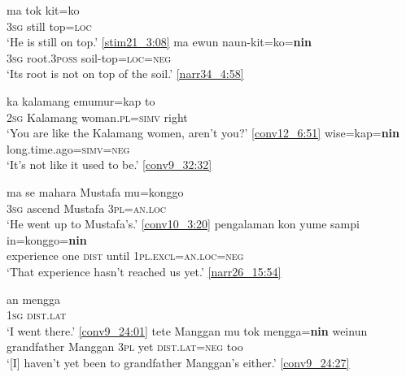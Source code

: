 \documentclass[output=paper,colorlinks,citecolor=brown,draft]{langscibook}
\begin{document}
\ea \label{exe:kal:negloc}
\ea \gll ma tok kit=ko\\
\textsc{3sg} still top=\textsc{loc}\\
\glt `He is still on top.' {\href{http://hdl.handle.net/10050/00-0000-0000-0004-1B94-F}{[stim21\_3:08]}}
\ex \gll ma ewun naun-kit=ko=\textbf{nin}\\
\textsc{3sg} root.\textsc{3poss} soil-top=\textsc{loc}=\textsc{neg}\\
\glt	`Its root is not on top of the soil.' {\href{http://hdl.handle.net/10050/00-0000-0000-0004-1BB1-3}{[narr34\_4:58]}}
\z \z 

\ea \label{exe:kal:wisenggap}
\ea \gll ka kalamang emumur=kap to\\
		\textsc{2sg} Kalamang woman.\textsc{pl}=\textsc{simv} right\\
		\glt `You are like the Kalamang women, aren't you?' {\href{http://hdl.handle.net/10050/00-0000-0000-0004-1BBD-5}{[conv12\_6:51]}}
\ex \gll wise=kap=\textbf{nin}\\
long.time.ago=\textsc{simv=neg}\\
\glt `It's not like it used to be.' {\href{http://hdl.handle.net/10050/00-0000-0000-0004-1B9F-F}{[conv9\_32:32]}}
\z \z

\ea \label{exe:kal:inggonggonin}
\ea \gll ma se mahara Mustafa mu=konggo\\
\textsc{3sg} {\glse} ascend Mustafa \textsc{3pl=an.loc}\\
\glt `He went up to Mustafa's.' {\href{http://hdl.handle.net/10050/00-0000-0000-0004-1BA3-3}{[conv10\_3:20]}}
\ex \gll pengalaman kon yume sampi in=konggo=\textbf{nin}\\
experience one \textsc{dist} until \textsc{1pl.excl=an.loc=neg}\\
\glt `That experience hasn't reached us yet.' {\href{http://hdl.handle.net/10050/00-0000-0000-0004-1C98-7}{[narr26\_15:54]}}
\z \z

\ea \label{exe:kal:mengganin}
\ea \gll an mengga\\
\textsc{1sg} \textsc{dist.lat}\\
\glt `I went there.' {\href{http://hdl.handle.net/10050/00-0000-0000-0004-1B9F-F}{[conv9\_24:01]}}
\ex \gll tete Manggan mu tok mengga=\textbf{nin} weinun\\
grandfather Manggan \textsc{3pl} yet \textsc{dist.lat=neg} too\\ 
\glt `[I] haven't yet been to grandfather Manggan's either.' {\href{http://hdl.handle.net/10050/00-0000-0000-0004-1B9F-F}{[conv9\_24:27]}}
\z \z
\end{document}
